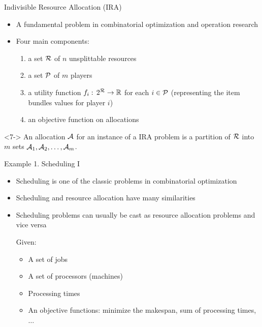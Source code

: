 \documentclass[10pt]{beamer}
\begin{document}
\begin{frame}{Indivisible Resource Allocation (IRA)}
\begin{itemize}
	\item<1-> A fundamental problem in combinatorial optimization and operation research	
	\item<2-> Four main components:
	\begin{enumerate}
		\item<3-> a set $\mathcal{R}$ of $n$ unsplittable resources
		\item<4-> a set $\mathcal{P}$ of $m$ players
		\item<5-> a \alert{utility} function $f_{i}: \, 2^{\mathcal{R}} \rightarrow \mathbb{R}$ for each $i \in \mathcal{P}$ (representing the item bundles values for player $i$)
		\item<6-> an objective function on \alert{allocations}
	\end{enumerate}
\end{itemize}
\begin{definition}[Allocation]<7->
An allocation $\mathcal{A}$ for an instance of a \textsc{IRA} problem is a partition of $\mathcal{R}$ into $m$ sets $\mathcal{A}_{1}, \mathcal{A}_{2}, \ldots, \mathcal{A}_{m}$.
\end{definition}
\end{frame}

\begin{frame}{Example 1. Scheduling I}
\begin{itemize}
	\item<1-> Scheduling is one of the classic problems in combinatorial optimization
	\item<2-> Scheduling and resource allocation have many similarities
	\item<3-> Scheduling problems can usually be cast as resource allocation problems and vice versa    
	\begin{example}
	    Given:
        \begin{itemize}
            \item<4-> A set of jobs
            \item<5-> A set of processors (machines)
            \item<6-> Processing times
            \item<7-> An objective functions: minimize the makespan, sum of processing times, $\ldots$
        \end{itemize}
    \end{example}
\end{itemize}
\end{frame}
\end{document}
